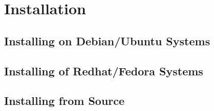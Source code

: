 \chapter{Installation}

\section{Installing on Debian/Ubuntu Systems}

\section{Installing of Redhat/Fedora Systems}

\section{Installing from Source}

